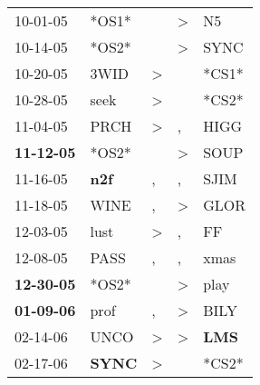 \begin{supertabular}{p{0.07\textwidth}p{0.06\textwidth}p{0.02\textwidth}p{0.02\textwidth}p{0.06\textwidth}}
          10-01-05\textsuperscript{} &                            *OS1* &                  &     \textgreater &             N5\textsuperscript{} \\
          10-14-05\textsuperscript{} &                            *OS2* &                  &     \textgreater &           SYNC\textsuperscript{} \\
          10-20-05\textsuperscript{} &           3WID\textsuperscript{} &     \textgreater &                  &                            *CS1* \\
          10-28-05\textsuperscript{} &           seek\textsuperscript{} &     \textgreater &                  &                            *CS2* \\
          11-04-05\textsuperscript{} &           PRCH\textsuperscript{} &     \textgreater &                , &           HIGG\textsuperscript{} \\
 \textbf{11-12-05\textsuperscript{}} &                            *OS2* &                  &     \textgreater &           SOUP\textsuperscript{} \\
          11-16-05\textsuperscript{} &   \textbf{n2f\textsuperscript{}} &                , &                , &           SJIM\textsuperscript{} \\
          11-18-05\textsuperscript{} &           WINE\textsuperscript{} &                , &     \textgreater &           GLOR\textsuperscript{} \\
          12-03-05\textsuperscript{} &           lust\textsuperscript{} &     \textgreater &                , &             FF\textsuperscript{} \\
          12-08-05\textsuperscript{} &           PASS\textsuperscript{} &                , &                , &           xmas\textsuperscript{} \\
 \textbf{12-30-05\textsuperscript{}} &                            *OS2* &                  &     \textgreater &           play\textsuperscript{} \\
 \textbf{01-09-06\textsuperscript{}} &           prof\textsuperscript{} &                , &     \textgreater &           BILY\textsuperscript{} \\
          02-14-06\textsuperscript{} &           UNCO\textsuperscript{} &     \textgreater &     \textgreater &   \textbf{LMS\textsuperscript{}} \\
          02-17-06\textsuperscript{} &  \textbf{SYNC\textsuperscript{}} &     \textgreater &                  &                            *CS2* \\

\end{supertabular}
